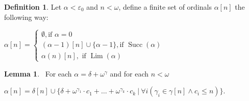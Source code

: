 \documentclass[8pt]{article}
\theoremstyle{definition}
\newtheorem{definition}{Definition}[section]
\theoremstyle{definition}
\theoremstyle{definition}
\theoremstyle{definition}
\theoremstyle{definition}
\theoremstyle{definition}
\theoremstyle{definition}
\theoremstyle{definition}
\newtheorem{lemma}{Lemma}[section]
\theoremstyle{definition}
\theoremstyle{definition}
\theoremstyle{definition}
\theoremstyle{definition}
\theoremstyle{definition}
\theoremstyle{question}
\begin{document}
\begin{definition}
  Let $\alpha < \varepsilon_0$ and $n < \omega$, define a finite set of ordinals $\alpha[n]$ the following way:

  \begin{center}
    $\alpha[n] = \begin{cases}
      \emptyset, \text{if $\alpha = 0 $} \\
      (\alpha - 1)[n] \cup \{ \alpha - 1 \}, \text{if $\operatorname{Succ}(\alpha)$} \\
      \alpha(n)[n], \text{ if $\operatorname{Lim}(\alpha)$}
    \end{cases}$
  \end{center}
\end{definition}

\begin{lemma}~\label{ord:sum:1}
  For each $\alpha = \delta + \omega^{\gamma}$ and for each $n < \omega$
  \begin{center}
    $\alpha[n] = \delta[n] \cup \{ \delta + \omega^{\gamma_1} \cdot c_1 + \dots + \omega^{\gamma_k} \cdot c_k \: | \: \forall i (\gamma_i \in \gamma[n] \land c_i \leq n) \}$.
  \end{center}
\end{lemma}
\end{document}
